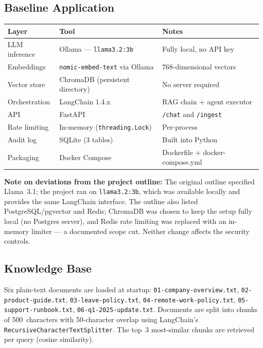 \documentclass[11pt,a4paper]{article}
\begin{document}
\subsection{Baseline Application}

\begin{center}
\begin{tabular}{lll}
\toprule
\textbf{Layer} & \textbf{Tool} & \textbf{Notes} \\
\midrule
LLM inference   & Ollama --- \texttt{llama3.2:3b}       & Fully local, no API key \\
Embeddings      & \texttt{nomic-embed-text} via Ollama  & 768-dimensional vectors \\
Vector store    & ChromaDB (persistent directory)       & No server required \\
Orchestration   & LangChain 1.4.x                       & RAG chain + agent executor \\
API             & FastAPI                                & \texttt{/chat} and \texttt{/ingest} \\
Rate limiting   & In-memory (\texttt{threading.Lock})   & Per-process \\
Audit log       & SQLite (3 tables)                     & Built into Python \\
Packaging       & Docker Compose                        & Dockerfile + docker-compose.yml \\
\bottomrule
\end{tabular}
\end{center}

\textbf{Note on deviations from the project outline:} The original outline
specified Llama~3.1; the project ran on \texttt{llama3.2:3b}, which was
available locally and provides the same LangChain interface. The outline also
listed PostgreSQL/pgvector and Redis; ChromaDB was chosen to keep the setup
fully local (no Postgres server), and Redis rate limiting was replaced with an
in-memory limiter --- a documented scope cut. Neither change affects the
security controls.

\subsection{Knowledge Base}

Six plain-text documents are loaded at startup:
\texttt{01-company-overview.txt},
\texttt{02-product-guide.txt},
\texttt{03-leave-policy.txt},
\texttt{04-remote-work-policy.txt},
\texttt{05-support-runbook.txt},
\texttt{06-q1-2025-update.txt}.
Documents are split into chunks of 500~characters with 50-character overlap
using LangChain's \texttt{RecursiveCharacterTextSplitter}. The top~3
most-similar chunks are retrieved per query (cosine similarity).
\end{document}
